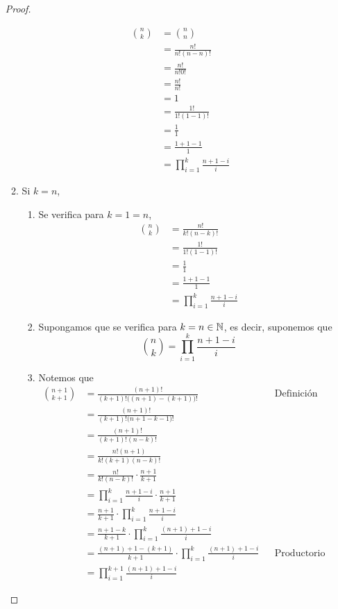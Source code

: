 \begin{enumerate}[label=\alph*)]
\begin{proof}
\begin{enumerate}[label=\Roman*)]
          \begin{align*}
            \binom{n}{k} &= \binom{n}{n}\\
            &= \frac{n!}{n!(n-n)!}\\
            &= \frac{n!}{n!0!}\\
            &= \frac{n!}{n!}\\
            &= 1\\
            &= \frac{1!}{1!(1-1)!}\\
            &= \frac{1}{1}\\
            &= \frac{1+1-1}{1}\\
            &= \prod_{i=1}^{k} \frac{n+1-i}{i}
          \end{align*}
          
          \item Si $k=n$,
          \begin{enumerate}[label=\roman*)]
            \item Se verifica para $k=1=n$,
            \begin{align*}
              \binom{n}{k} &= \frac{n!}{k!(n-k)!}\\
              &= \frac{1!}{1!(1-1)!}\\
              &= \frac{1}{1}\\
              &= \frac{1+1-1}{1}\\
              &= \prod_{i=1}^{k} \frac{n+1-i}{i}
            \end{align*}
            \item Supongamos que se verifica para $k=n\in \mathbb{N}$, es decir, suponemos que \[\binom{n}{k} = \prod_{i=1}^{k} \frac{n+1-i}{i}\]
            \item Notemos que
            \begin{align*}
              \binom{n+1}{k+1}
              &= \frac{(n+1)!}{(k+1)!\big((n+1)-(k+1)\big)!} && \text{Definición}\\
              &= \frac{(n+1)!}{(k+1)!\big(n+1-k-1\big)!}\\
              &= \frac{(n+1)!}{(k+1)!(n-k)!}\\
              &= \frac{n!(n+1)}{k!(k+1)(n-k)!}\\
              &= \frac{n!}{k!(n-k)!} \cdot \frac{n+1}{k+1}\\
              &= \prod_{i=1}^{k} \frac{n+1-i}{i} \cdot \frac{n+1}{k+1}\\
              &= \frac{n+1}{k+1}\cdot \prod_{i=1}^{k} \frac{n+1-i}{i}\\
              &= \frac{n+1-k}{k+1} \cdot \prod_{i=1}^{k} \frac{(n+1)+1-i}{i}\\
              &= \frac{(n+1)+1-(k+1)}{k+1} \cdot \prod_{i=1}^{k} \frac{(n+1)+1-i}{i}&& \text{Productorio inverso}\\
              &= \prod_{i=1}^{k+1} \frac{(n+1)+1-i}{i}
            \end{align*}
          \end{enumerate}
         \end{enumerate}
  \end{proof}
  

\end{enumerate}
